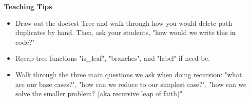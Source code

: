 \begin{blocksection}
\begin{guide}
    \textbf{Teaching Tips}
    \begin{itemize}
       \item Draw out the doctest Tree and walk through how you would delete path duplicates by hand. Then, ask your students, "how would we write this in code?"
       \item Recap tree functions "is\_leaf", "branches", and "label" if need be.
       \item Walk through the three main questions we ask when doing recursion: "what are our base cases?", "how can we reduce to our simplest case?", "how can we solve the smaller problem? (aka recursive leap of faith)"
    \end{itemize}
 \end{guide}

\end{blocksection}
